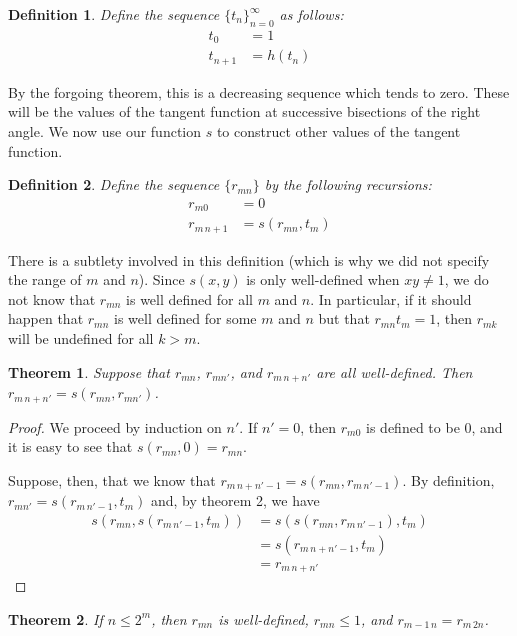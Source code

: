 \documentclass[12pt]{article}
\newtheorem{dfn}{Definition}
\newtheorem{thm}{Theorem}
\begin{document}
\begin{dfn}
Define the sequence $\{t_n\}_{n=0}^\infty$ as follows:
\begin{align*}
t_0 &= 1 \\
t_{n+1} &= h(t_n)
\end{align*}
\end{dfn}

By the forgoing theorem, this is a decreasing sequence which tends
to zero.  These will be the values of the tangent function at 
successive bisections of the right angle.  We now use our function 
$s$ to construct other values of the tangent function.

\begin{dfn}
Define the sequence $\{r_{mn}\}$ by the following recursions:
\begin{align*}
r_{m0} &= 0 \\
r_{m \, n+1} &= s(r_{mn},t_m)
\end{align*}
\end{dfn}

There is a subtlety involved in this definition (which is why we
did not specify the range of $m$ and $n$).  Since $s(x,y)$ is
only well-defined when $xy \neq 1$, we do not know that $r_{mn}$ 
is well defined for all $m$ and $n$.  In particular, if it should
happen that $r_{mn}$ is well defined for some $m$ and $n$ but that
$r_{mn} t_m = 1$, then $r_{mk}$ will be undefined for all $k > m$.


\begin{thm}
Suppose that $r_{mn}$, $r_{mn'}$, and $r_{m \, n+n'}$ are all well-defined.
Then $r_{m \, n+n'} = s(r_{mn}, r_{mn'})$.
\end{thm}

\begin{proof}
We proceed by induction on $n'$.  If $n'=0$, then $r_{m0}$ is defined to
be $0$, and it is easy to see that $s(r_{mn},0) = r_{mn}$.

Suppose, then, that we know that $r_{m \, n+n'-1} = s(r_{mn}, 
r_{m \,n'-1})$.  By definition, $r_{mn'} = s(r_{m \, n'-1}, t_m)$ and,
by theorem 2, we have 
\begin{align*}
s(r_{mn}, s(r_{m \, n'-1}, t_m)) &= 
s(s (r_{mn}, r_{m \, n'-1}), t_m) \\ &=
s(r_{m \, n+n'-1}, t_m) \\ &=
r_{m \, n + n'}
\end{align*}
\end{proof}

\begin{thm}
If $n \le 2^m$, then $r_{mn}$ is well-defined, $r_{mn} \le 1$, and 
$r_{m-1 \, n} = r_{m \, 2n}$.
\end{thm}
\end{document}
